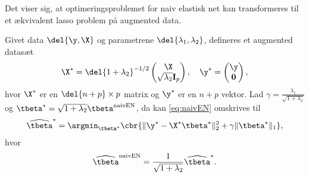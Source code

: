 %
Det viser sig, at optimeringsproblemet for naiv elastisk net kan transformeres til et ækvivalent lasso problem på augmented data.
%
\begin{lem} \label{lem:elastisk_net}
Givet data \(\del{\y, \X}\) og parametrene \(\del{\lambda_1, \lambda_2}\), defineres et augmented datasæt 
\begin{align*}
\X^* = \del{1 + \lambda_2}^{-1/2} \begin{pmatrix}
\X \\ \sqrt{\lambda_2} \mathbf{I}_p
\end{pmatrix}, \quad \y^* = \begin{pmatrix}
\y \\ \mathbf{0}
\end{pmatrix},
\end{align*}
hvor \(\X^*\) er en \(\del{n+p} \times p\) matrix og \(\y^*\) er en \(n + p\) vektor. 
Lad \(\gamma = \frac{\lambda_1}{\sqrt{1+\lambda_2}}\) og \(\tbeta^* = \sqrt{1+\lambda_2} \tbeta^\text{naivEN}\), da kan \eqref{eq:naivEN} omskrives til
\begin{align}
\widehat{\tbeta}^* = \argmin_{\tbeta^*} \cbr{ \Vert \y^* - \X^* \tbeta^* \Vert_2^2 +\gamma \Vert \tbeta^* \Vert_1}, \label{eq:EN11}
\end{align}
hvor
\begin{align*}
\widehat{\tbeta}^\text{naivEN} = \frac{1}{\sqrt{1+\lambda_2}} \widehat{\tbeta}^*.
\end{align*}
\end{lem}
%
